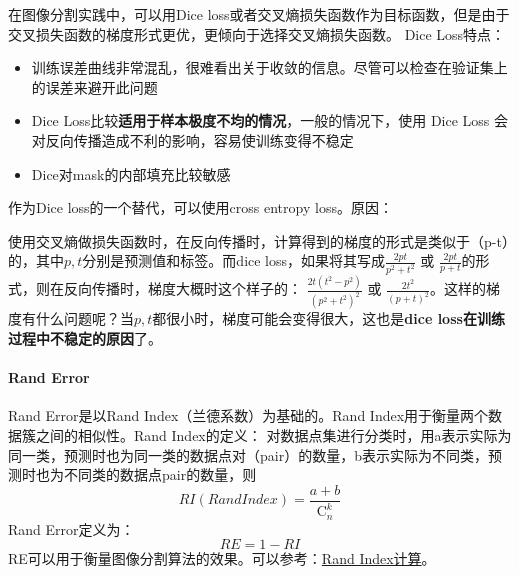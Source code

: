 在图像分割实践中，可以用Dice loss或者交叉熵损失函数作为目标函数，但是由于交叉损失函数的梯度形式更优，更倾向于选择交叉熵损失函数。
Dice Loss特点：
\begin{itemize}
	\item 训练误差曲线非常混乱，很难看出关于收敛的信息。尽管可以检查在验证集上的误差来避开此问题
	\item Dice Loss比较\textbf{适用于样本极度不均的情况}，一般的情况下，使用 Dice Loss 会对反向传播造成不利的影响，容易使训练变得不稳定
	\item Dice对mask的内部填充比较敏感
	
\end{itemize}
作为Dice loss的一个替代，可以使用cross entropy loss。原因：
\begin{center}
	使用交叉熵做损失函数时，在反向传播时，计算得到的梯度的形式是类似于（p-t）的，其中$p, t$分别是预测值和标签。而dice loss，如果将其写成$\frac{2pt}{p^2+t^2}$ 或 $\frac{2pt}{p+t}$的形式，则在反向传播时，梯度大概时这个样子的： $\frac{2t(t^2-p^2)}{(p^2+t^2)^2}$ 或 $\frac{2t^2}{(p+t)^2}$。这样的梯度有什么问题呢？当$p, t$都很小时，梯度可能会变得很大，这也是\textbf{dice loss在训练过程中不稳定的原因}了。
\end{center}



\paragraph{Rand Error}
Rand Error是以Rand Index（兰德系数）为基础的。Rand Index用于衡量两个数据簇之间的相似性。Rand Index的定义：
对数据点集进行分类时，用a表示实际为同一类，预测时也为同一类的数据点对（pair）的数量，b表示实际为不同类，预测时也为不同类的数据点pair的数量，则
$$
RI(Rand Index) = \frac{a + b}{\mathrm{C}_n^k}
$$
Rand Error定义为：
$$
RE = 1 - RI
$$
RE可以用于衡量图像分割算法的效果。可以参考：\href{http://www.otlet-institute.org/wikics/Clustering_Problems.html#toc-Subsection-4.1}{Rand Index计算}。

